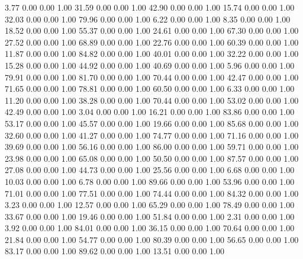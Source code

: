     3.77   0.00   0.00   1.00
   31.59   0.00   0.00   1.00
   42.90   0.00   0.00   1.00
   15.74   0.00   0.00   1.00
   32.03   0.00   0.00   1.00
   79.96   0.00   0.00   1.00
    6.22   0.00   0.00   1.00
    8.35   0.00   0.00   1.00
   18.52   0.00   0.00   1.00
   55.37   0.00   0.00   1.00
   24.61   0.00   0.00   1.00
   67.30   0.00   0.00   1.00
   27.52   0.00   0.00   1.00
   68.89   0.00   0.00   1.00
   22.76   0.00   0.00   1.00
   60.39   0.00   0.00   1.00
   11.87   0.00   0.00   1.00
   84.82   0.00   0.00   1.00
   40.01   0.00   0.00   1.00
   32.22   0.00   0.00   1.00
   15.28   0.00   0.00   1.00
   44.92   0.00   0.00   1.00
   40.69   0.00   0.00   1.00
    5.96   0.00   0.00   1.00
   79.91   0.00   0.00   1.00
   81.70   0.00   0.00   1.00
   70.44   0.00   0.00   1.00
   42.47   0.00   0.00   1.00
   71.65   0.00   0.00   1.00
   78.81   0.00   0.00   1.00
   60.50   0.00   0.00   1.00
    6.33   0.00   0.00   1.00
   11.20   0.00   0.00   1.00
   38.28   0.00   0.00   1.00
   70.44   0.00   0.00   1.00
   53.02   0.00   0.00   1.00
   42.49   0.00   0.00   1.00
    3.04   0.00   0.00   1.00
   16.21   0.00   0.00   1.00
   83.86   0.00   0.00   1.00
   53.17   0.00   0.00   1.00
   45.57   0.00   0.00   1.00
   19.66   0.00   0.00   1.00
   85.68   0.00   0.00   1.00
   32.60   0.00   0.00   1.00
   41.27   0.00   0.00   1.00
   74.77   0.00   0.00   1.00
   71.16   0.00   0.00   1.00
   39.69   0.00   0.00   1.00
   56.16   0.00   0.00   1.00
   86.00   0.00   0.00   1.00
   59.71   0.00   0.00   1.00
   23.98   0.00   0.00   1.00
   65.08   0.00   0.00   1.00
   50.50   0.00   0.00   1.00
   87.57   0.00   0.00   1.00
   27.08   0.00   0.00   1.00
   44.73   0.00   0.00   1.00
   25.56   0.00   0.00   1.00
    6.68   0.00   0.00   1.00
   10.03   0.00   0.00   1.00
    6.78   0.00   0.00   1.00
   89.66   0.00   0.00   1.00
   53.96   0.00   0.00   1.00
   71.01   0.00   0.00   1.00
   77.51   0.00   0.00   1.00
   74.44   0.00   0.00   1.00
   84.32   0.00   0.00   1.00
    3.23   0.00   0.00   1.00
   12.57   0.00   0.00   1.00
   65.29   0.00   0.00   1.00
   78.49   0.00   0.00   1.00
   33.67   0.00   0.00   1.00
   19.46   0.00   0.00   1.00
   51.84   0.00   0.00   1.00
    2.31   0.00   0.00   1.00
    3.92   0.00   0.00   1.00
   84.01   0.00   0.00   1.00
   36.15   0.00   0.00   1.00
   70.64   0.00   0.00   1.00
   21.84   0.00   0.00   1.00
   54.77   0.00   0.00   1.00
   80.39   0.00   0.00   1.00
   56.65   0.00   0.00   1.00
   83.17   0.00   0.00   1.00
   89.62   0.00   0.00   1.00
   13.51   0.00   0.00   1.00
